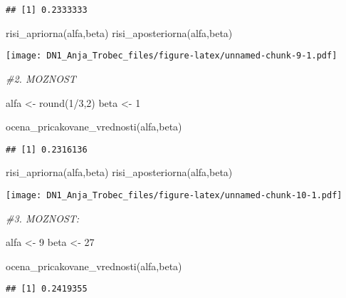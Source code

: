 \documentclass[
]{article}
\newenvironment{Shaded}{\begin{snugshade}}{\end{snugshade}}
\newcommand{\CommentTok}[1]{\textcolor[rgb]{0.56,0.35,0.01}{\textit{#1}}}
\newcommand{\DecValTok}[1]{\textcolor[rgb]{0.00,0.00,0.81}{#1}}
\newcommand{\FunctionTok}[1]{\textcolor[rgb]{0.00,0.00,0.00}{#1}}
\newcommand{\NormalTok}[1]{#1}
\newcommand{\OtherTok}[1]{\textcolor[rgb]{0.56,0.35,0.01}{#1}}
\newcommand{\SpecialCharTok}[1]{\textcolor[rgb]{0.00,0.00,0.00}{#1}}
\begin{document}
\begin{verbatim}
## [1] 0.2333333
\end{verbatim}

\begin{Shaded}
\begin{Highlighting}[]
\FunctionTok{risi\_apriorna}\NormalTok{(alfa,beta)}
\FunctionTok{risi\_aposteriorna}\NormalTok{(alfa,beta)}
\end{Highlighting}
\end{Shaded}

\texttt{[image: DN1\_Anja\_Trobec\_files/figure-latex/unnamed-chunk-9-1.pdf]}

\begin{Shaded}
\begin{Highlighting}[]
\CommentTok{\#2. MOZNOST}

\NormalTok{alfa }\OtherTok{\textless{}{-}} \FunctionTok{round}\NormalTok{(}\DecValTok{1}\SpecialCharTok{/}\DecValTok{3}\NormalTok{,}\DecValTok{2}\NormalTok{)}
\NormalTok{beta }\OtherTok{\textless{}{-}} \DecValTok{1}

\FunctionTok{ocena\_pricakovane\_vrednosti}\NormalTok{(alfa,beta)}
\end{Highlighting}
\end{Shaded}

\begin{verbatim}
## [1] 0.2316136
\end{verbatim}

\begin{Shaded}
\begin{Highlighting}[]
\FunctionTok{risi\_apriorna}\NormalTok{(alfa,beta)}
\FunctionTok{risi\_aposteriorna}\NormalTok{(alfa,beta)}
\end{Highlighting}
\end{Shaded}

\texttt{[image: DN1\_Anja\_Trobec\_files/figure-latex/unnamed-chunk-10-1.pdf]}

\begin{Shaded}
\begin{Highlighting}[]
\CommentTok{\#3. MOZNOST: }

\NormalTok{alfa }\OtherTok{\textless{}{-}} \DecValTok{9}
\NormalTok{beta }\OtherTok{\textless{}{-}} \DecValTok{27}


\FunctionTok{ocena\_pricakovane\_vrednosti}\NormalTok{(alfa,beta)}
\end{Highlighting}
\end{Shaded}

\begin{verbatim}
## [1] 0.2419355
\end{verbatim}
\end{document}
